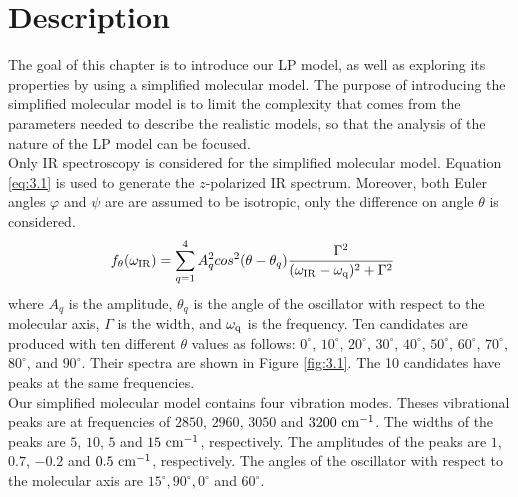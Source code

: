  \label{ch:3}

\section{Description}
The goal of this chapter is to introduce our LP model, as well as exploring its properties by using a simplified molecular model. The purpose of introducing the simplified molecular model is to limit the complexity that comes from the parameters needed to describe the realistic models, so that the analysis of the nature of the LP model can be focused. \\

Only IR spectroscopy is considered for the simplified molecular model. Equation \ref{eq:3.1} is used to generate the $z$-polarized IR spectrum. Moreover, both Euler angles $\varphi$ and $\psi$ are are assumed to be isotropic, only the difference on angle $\theta$ is considered. \\

\begin{eqnarray} \label{eq:3.1}
& f_{\theta}(\omega_{\rm IR}) = \displaystyle\sum^{4}_{q=1} A_q^2 cos^2(\theta - \theta_q)\frac{\Gamma^2}{(\omega_{\rm IR}- \omega_{\rm q})^2 + \Gamma^2} 
\end{eqnarray}
where $A_{q}$ is the amplitude, $\theta_{q}$ is the angle of the oscillator with respect to the molecular axis, $\Gamma$ is the width, and $\omega_{\rm q}$ is the frequency. Ten candidates are produced with ten different $\theta$ values as follows: $0^{\circ}$, $10^{\circ}$, $20^{\circ}$, $30^{\circ}$, $40^{\circ}$, $50^{\circ}$, $60^{\circ}$, $70^{\circ}$, $80^{\circ}$, and $90^{\circ}$. Their spectra are shown in Figure \ref{fig:3.1}. The 10 candidates have peaks at the same frequencies. \\

Our simplified molecular model contains four vibration modes. Theses vibrational peaks are at frequencies of $2850$, $2960$, $3050$ and $3200~\rm cm^{-1}$. The widths of the peaks are $5$, $10$, $5$ and $15~\rm cm^{-1}$, respectively. The amplitudes of the peaks are $1$, $0.7$, $-0.2$ and $0.5~\rm cm^{-1}$, respectively. The angles of the oscillator with respect to the molecular axis are $15^{\circ}, 90^{\circ}, 0^{\circ}$ and $60^{\circ}$. \\

